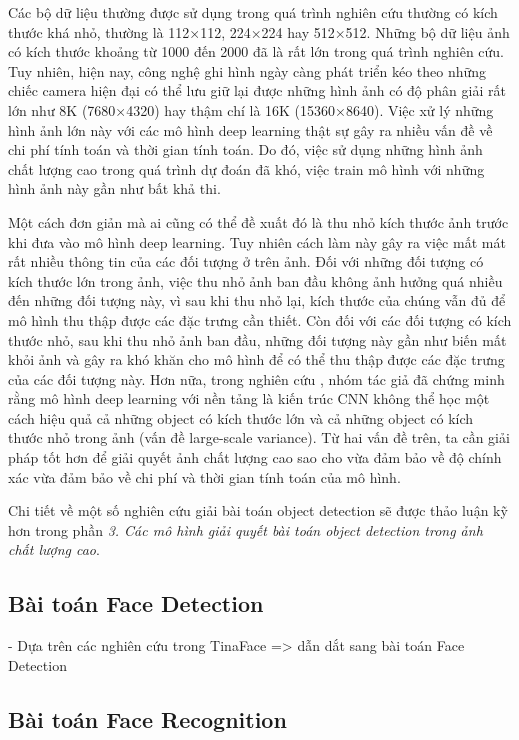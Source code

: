 {    \noindent
    Các bộ dữ liệu thường được sử dụng trong quá trình nghiên cứu thường có kích thước khá nhỏ, thường là 112×112, 224×224 hay 512×512.
    Những bộ dữ liệu ảnh có kích thước khoảng từ 1000 đến 2000 đã là rất lớn trong quá trình nghiên cứu.
    Tuy nhiên, hiện nay, công nghệ ghi hình ngày càng phát triển kéo theo những chiếc camera hiện đại có thể lưu giữ lại được những hình ảnh có độ phân giải rất lớn như 8K (7680×4320) hay thậm chí là 16K (15360×8640).
    Việc xử lý những hình ảnh lớn này với các mô hình deep learning thật sự gây ra nhiều vấn đề về chi phí tính toán và thời gian tính toán.
    Do đó, việc sử dụng những hình ảnh chất lượng cao trong quá trình dự đoán đã khó, việc train mô hình với những hình ảnh này gần như bất khả thi.

    \noindent
    Một cách đơn giản mà ai cũng có thể đề xuất đó là thu nhỏ kích thước ảnh trước khi đưa vào mô hình deep learning.
    Tuy nhiên cách làm này gây ra việc mất mát rất nhiều thông tin của các đối tượng ở trên ảnh.
    Đối với những đối tượng có kích thước lớn trong ảnh, việc thu nhỏ ảnh ban đầu không ảnh hưởng quá nhiều đến những đối tượng này, vì sau khi thu nhỏ lại, kích thước của chúng vẫn đủ để mô hình thu thập được các đặc trưng cần thiết.
    Còn đối với các đối tượng có kích thước nhỏ, sau khi thu nhỏ ảnh ban đầu, những đối tượng này gần như biến mất khỏi ảnh và gây ra khó khăn cho mô hình để có thể thu thập được các đặc trưng của các đối tượng này.
    Hơn nữa, trong nghiên cứu \cite{singh2018analysis}, nhóm tác giả đã chứng minh rằng mô hình deep learning với nền tảng là kiến trúc CNN không thể học một cách hiệu quả cả những object có kích thước lớn và cả những object có kích thước nhỏ trong ảnh (vấn đề large-scale variance).
    Từ hai vấn đề trên, ta cần giải pháp tốt hơn để giải quyết ảnh chất lượng cao sao cho vừa đảm bảo về độ chính xác vừa đảm bảo về chi phí và thời gian tính toán của mô hình.

    \noindent
    Chi tiết về một số nghiên cứu giải bài toán object detection sẽ được thảo luận kỹ hơn trong phần \textit{3. Các mô hình giải quyết bài toán object detection trong ảnh chất lượng cao}.

    \subsection{Bài toán Face Detection}
    - Dựa trên các nghiên cứu trong TinaFace => dẫn dắt sang bài toán Face Detection
    
    \subsection{Bài toán Face Recognition}
}